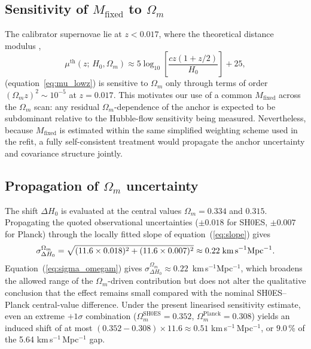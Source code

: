 \documentclass[fleqn,usenatbib,useAMS]{mnras}
\begin{document}
\subsection{Sensitivity of $M_\mathrm{fixed}$ to $\Omega_m$}

The calibrator supernovae lie at $z < 0.017$, where the theoretical
distance modulus \citep{hogg1999},
\begin{equation}
  \mu^\mathrm{th}(z;\,H_0,\Omega_m)
  \approx 5\log_{10}\!\left[\frac{cz(1+z/2)}{H_0}\right] + 25,
  \label{eq:mu_lowz}
\end{equation}
(equation~\ref{eq:mu_lowz}) is sensitive to $\Omega_m$ only through terms of order
$(\Omega_m z)^2 \sim 10^{-5}$ at $z = 0.017$.
This motivates our use of a common $M_\mathrm{fixed}$ across the
$\Omega_m$ scan: any residual $\Omega_m$-dependence of the anchor
is expected to be subdominant relative to the Hubble-flow
sensitivity being measured.
Nevertheless, because $M_\mathrm{fixed}$ is estimated within the
same simplified weighting scheme used in the refit, a fully
self-consistent treatment would propagate the anchor uncertainty
and covariance structure jointly.

\subsection{Propagation of $\Omega_m$ uncertainty}

The shift $\Delta H_0$ is evaluated at the central values
$\Omega_m = 0.334$ and $0.315$.
Propagating the quoted observational uncertainties
($\pm 0.018$ for SH0ES, $\pm 0.007$ for Planck) through the
locally fitted slope of equation~(\ref{eq:slope}) gives
\begin{equation}
  \sigma_{\Delta H_0}^{\Omega_m}
    = \sqrt{(11.6 \times 0.018)^2 + (11.6 \times 0.007)^2}
    \approx 0.22\;\text{km\,s}^{-1}\text{Mpc}^{-1}.
  \label{eq:sigma_omegam}
\end{equation}
Equation~(\ref{eq:sigma_omegam}) gives $\sigma_{\Delta H_0}^{\Omega_m} \approx 0.22$~km\,s$^{-1}$Mpc$^{-1}$, which broadens the allowed range of the $\Omega_m$-driven contribution
but does not alter the qualitative conclusion that the effect
remains small compared with the nominal SH0ES--Planck central-value
difference.
Under the present linearised sensitivity estimate, even an extreme
$+1\sigma$ combination ($\Omega_m^\mathrm{SH0ES} = 0.352$,
$\Omega_m^\mathrm{Planck} = 0.308$) yields an induced shift of at
most $(0.352 - 0.308) \times 11.6 \approx 0.51$
km\,s$^{-1}$\,Mpc$^{-1}$, or $9.0$\,\% of the 5.64
km\,s$^{-1}$\,Mpc$^{-1}$ gap.
\end{document}
